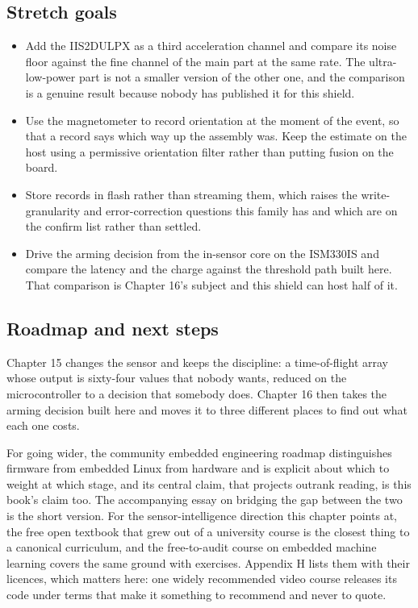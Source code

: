 \subsection*{Stretch goals}

\begin{itemize}
\item Add the IIS2DULPX as a third acceleration channel and compare its noise
floor against the fine channel of the main part at the same rate. The
ultra-low-power part is not a smaller version of the other one, and the
comparison is a genuine result because nobody has published it for this shield.
\item Use the magnetometer to record orientation at the moment of the event, so
that a record says which way up the assembly was. Keep the estimate on the host
using a permissive orientation filter rather than putting fusion on the board.
\item Store records in flash rather than streaming them, which raises the
write-granularity and error-correction questions this family has and which are
on the confirm list rather than settled.
\item Drive the arming decision from the in-sensor core on the ISM330IS and
compare the latency and the charge against the threshold path built here. That
comparison is Chapter 16's subject and this shield can host half of it.
\end{itemize}

\subsection*{Roadmap and next steps}

Chapter 15 changes the sensor and keeps the discipline: a time-of-flight array
whose output is sixty-four values that nobody wants, reduced on the
microcontroller to a decision that somebody does. Chapter 16 then takes the
arming decision built here and moves it to three different places to find out
what each one costs.

For going wider, the community embedded engineering roadmap distinguishes
firmware from embedded Linux from hardware and is explicit about which to weight
at which stage, and its central claim, that projects outrank reading, is this
book's claim too. The accompanying essay on bridging the gap between the two is
the short version. For the sensor-intelligence direction this chapter points at,
the free open textbook that grew out of a university course is the closest thing
to a canonical curriculum, and the free-to-audit course on embedded machine
learning covers the same ground with exercises. Appendix H lists them with their
licences, which matters here: one widely recommended video course releases its
code under terms that make it something to recommend and never to quote.

